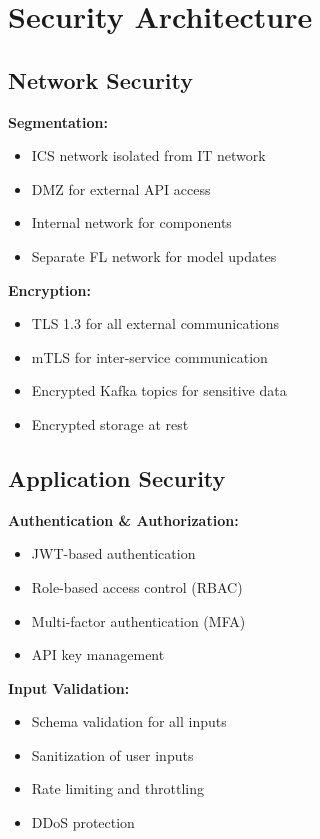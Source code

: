 \documentclass[12pt,a4paper]{article}
\begin{document}
\section{Security Architecture}

\subsection{Network Security}

\textbf{Segmentation:}
\begin{itemize}[leftmargin=1cm,itemsep=0pt]
    \item ICS network isolated from IT network
    \item DMZ for external API access
    \item Internal network for components
    \item Separate FL network for model updates
\end{itemize}

\textbf{Encryption:}
\begin{itemize}[leftmargin=1cm,itemsep=0pt]
    \item TLS 1.3 for all external communications
    \item mTLS for inter-service communication
    \item Encrypted Kafka topics for sensitive data
    \item Encrypted storage at rest
\end{itemize}

\subsection{Application Security}

\textbf{Authentication \& Authorization:}
\begin{itemize}[leftmargin=1cm,itemsep=0pt]
    \item JWT-based authentication
    \item Role-based access control (RBAC)
    \item Multi-factor authentication (MFA)
    \item API key management
\end{itemize}

\textbf{Input Validation:}
\begin{itemize}[leftmargin=1cm,itemsep=0pt]
    \item Schema validation for all inputs
    \item Sanitization of user inputs
    \item Rate limiting and throttling
    \item DDoS protection
\end{itemize}
\end{document}
